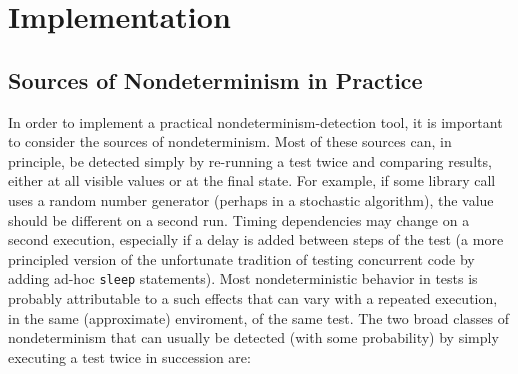 \section{Implementation}


\subsection{Sources of Nondeterminism in Practice}

In order to implement a practical nondeterminism-detection tool, it is
important to consider the sources of nondeterminism.  Most of these
sources can, in principle, be detected simply by re-running a test
twice and comparing results, either at all visible values or at the
final state.  For example, if some library call uses a random number
generator (perhaps in a stochastic algorithm), the value should be
different on a second run.  Timing dependencies may change on a second
execution, especially if a delay is added between steps of the test (a
more principled version of the unfortunate tradition of testing
concurrent code by adding ad-hoc {\tt sleep} statements).   Most
nondeterministic behavior in tests is probably attributable to a such
effects that can vary with a repeated execution, in the same
(approximate) enviroment, of the same test.  The two broad classes of
nondeterminism that can usually be detected (with some probability) by
simply executing a test twice in succession are:

